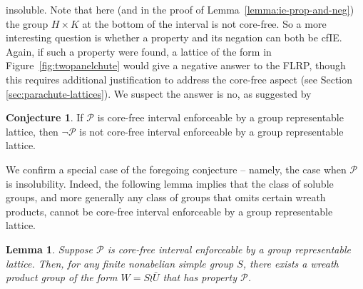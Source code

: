 \documentclass{gen-j-l}
\newcommand{\<}{\ensuremath{\langle}}
\renewcommand{\>}{\ensuremath{\rangle}}
\theoremstyle{plain}
\newtheorem{lemma}[theorem]{Lemma}
\theoremstyle{definition}
\newcounter{conjecture}
\newtheorem{conjecture}[conjecture]{Conjecture}
\theoremstyle{remark}
\numberwithin{theorem}{section}
\numberwithin{claim}{section}
\numberwithin{equation}{section}
\numberwithin{conjecture}{section}
\newcommand{\2}{\ensuremath{\mathbf{2}}}
\newcommand{\3}{\ensuremath{\mathbf{3}}}
\newcommand{\cP}{\ensuremath{\mathcal{P}}}
\begin{document}
insoluble.  Note that here (and in the proof 
of Lemma~\ref{lemma:ie-prop-and-neg}) the group $H\times K$ at the bottom of
the interval is not core-free.  So a more interesting question is whether a
property and its negation can both be \acs{cfIE}.  Again, if such a property were
found, a lattice of the form in Figure~\ref{fig:twopanelchute} would give a
negative answer to the \acs{FLRP}, though this requires additional justification to address
the core-free aspect (see Section \ref{sec:parachute-lattices}).  
We suspect the answer is no, as suggested by
\begin{conjecture}
\label{conjecture:isle-prop2}
If $\cP$ is core-free interval enforceable by a group representable lattice,
then $\neg \cP$ is not core-free interval enforceable by a group representable lattice.
\end{conjecture}

We confirm a special case of the foregoing conjecture -- namely, the case when
$\cP$ is insolubility. Indeed, the following lemma implies that the class of
soluble groups, and more generally any class of groups that omits certain wreath
products, cannot be core-free interval enforceable by a group representable lattice.
\begin{lemma}
  \label{lem:IE-must-have-wreaths}
Suppose $\cP$ is core-free interval enforceable by a group
representable lattice.   
Then, for any finite nonabelian simple group $S$, there exists a wreath product group
of the form $W = S\wr \bar{U}$ that has property $\cP$.
\end{lemma}
\end{document}
